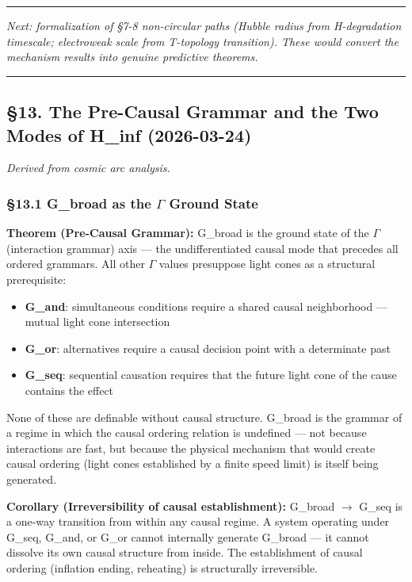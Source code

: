 \documentclass[12pt,a4paper]{article}
\newcommand{\pilcrow}{\S}
\begin{document}
\begin{center}
\rule{0.5\textwidth}{0.4pt}
\end{center}

\emph{Next: formalization of \pilcrow{}7-8 non-circular paths (Hubble radius from H-degradation timescale; electroweak scale from T-topology transition). These would convert the mechanism results into genuine predictive theorems.}

\begin{center}
\rule{0.5\textwidth}{0.4pt}
\end{center}

\subsection{\pilcrow{}13. The Pre-Causal Grammar and the Two Modes of H\_inf (2026-03-24)}

\emph{Derived from cosmic arc analysis.}

\subsubsection{\pilcrow{}13.1 G\_broad as the $\Gamma$ Ground State}

\textbf{Theorem (Pre-Causal Grammar):} G\_broad is the ground state of the $\Gamma$ (interaction grammar) axis --- the undifferentiated causal mode that precedes all ordered grammars. All other $\Gamma$ values presuppose light cones as a structural prerequisite:

\begin{itemize}
    \item \textbf{G\_and}: simultaneous conditions require a shared causal neighborhood --- mutual light cone intersection
    \item \textbf{G\_or}: alternatives require a causal decision point with a determinate past
    \item \textbf{G\_seq}: sequential causation requires that the future light cone of the cause contains the effect
\end{itemize}

None of these are definable without causal structure. G\_broad is the grammar of a regime in which the causal ordering relation is undefined --- not because interactions are fast, but because the physical mechanism that would create causal ordering (light cones established by a finite speed limit) is itself being generated.

\textbf{Corollary (Irreversibility of causal establishment):} G\_broad $\to$ G\_seq is a one-way transition from within any causal regime. A system operating under G\_seq, G\_and, or G\_or cannot internally generate G\_broad --- it cannot dissolve its own causal structure from inside. The establishment of causal ordering (inflation ending, reheating) is structurally irreversible.
\end{document}
